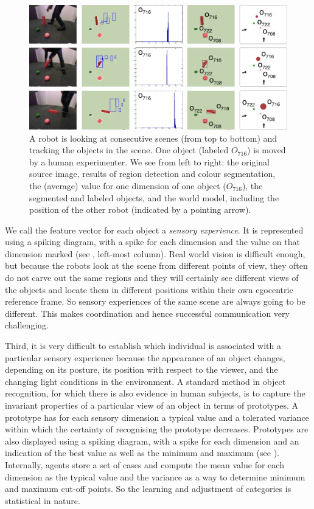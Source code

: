 \begin{figure}[htbp]
  \centerline{\includegraphics[width=.85\textwidth]{chap10/figs/png-perception.pdf}}
\caption{\label{fig:png-perception}A robot is looking at consecutive scenes (from top to bottom) and tracking the objects in the scene. One object (labeled $O_{716}$)
is moved by a human experimenter.  We see from left to right: the original source image, results of region detection and 
colour segmentation, the (average) value for one dimension of one object ($O_{716}$), the segmented and labeled objects, 
and the world model, including the position of the other robot (indicated by a pointing arrow). }
\end{figure}
\clearpage
We call the feature vector for each object a {\itshape sensory experience}. 
It is represented using a spiking 
diagram, with a spike for each dimension and the value on that dimension marked (see 
, left-most column). Real
world vision is difficult enough, but because the robots look at the
scene from different points of view, they often do not carve out the
same regions and they will certainly see different views of the
objects and locate them in different positions within their own
egocentric reference frame. So sensory experiences of the same scene
are always going to be different. This makes coordination and hence successful
communication very challenging. 

Third, it is very difficult to establish which individual is associated with a particular
sensory experience because the appearance of an object changes, depending on
its posture, its position with respect to the viewer, and the changing
light conditions in the environment. A standard method in object
recognition, for which there is also evidence in human subjects, is to
capture the invariant properties of a particular view of an object in
terms of prototypes. A prototype has for each sensory dimension a typical value and a tolerated variance
within which the certainty of recognising the prototype decreases. Prototypes are also displayed using a spiking 
diagram, with a spike for each dimension and an indication of the best value as well as the minimum and maximum
(see ). Internally, agents store a set of cases 
and compute the mean value for each dimension as the typical value and the variance as a way to determine 
minimum and maximum cut-off points. So the learning and adjustment of categories is statistical in nature. 

